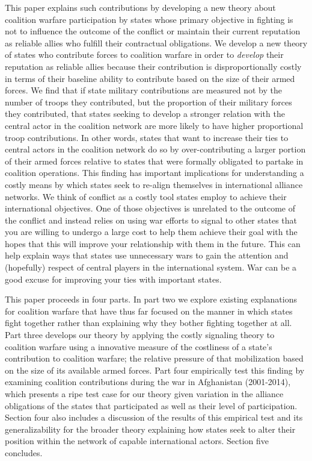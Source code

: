 \documentclass[12pt,letterpaper]{article}
\begin{document}
	This paper explains such contributions by developing a new theory about coalition warfare participation by states whose primary objective in fighting is not to influence the outcome of the conflict or maintain their current reputation as reliable allies who fulfill their contractual obligations. We develop a new theory of states who contribute forces to coalition warfare in order to \textit{develop} their reputation as reliable allies because their contribution is disproportionally costly in terms of their baseline ability to contribute based on the size of their armed forces. We find that if state military contributions are measured not by the number of troops they contributed, but the proportion of their military forces they contributed, that states seeking to develop a stronger relation with the central actor in the coalition network are more likely to have higher proportional troop contributions. In other words, states that want to increase their ties to central actors in the coalition network do so by over-contributing a larger portion of their armed forces relative to states that were formally obligated to partake in coalition operations. This finding has important implications for understanding a costly means by which states seek to re-align themselves in international alliance networks. We think of conflict as a costly tool states employ to achieve their international objectives. One of those objectives is unrelated to the outcome of the conflict and instead relies on using war efforts to signal to other states that you are willing to undergo a large cost to help them achieve their goal with the hopes that this will improve your relationship with them in the future. This can help explain ways that states use unnecessary wars to gain the attention and (hopefully) respect of central players in the international system. War can be a good excuse for improving your ties with important states.

	This paper proceeds in four parts. In part two we explore existing explanations for coalition warfare that have thus far focused on the manner in which states fight together rather than explaining why they bother fighting together at all. Part three develops our theory by applying the costly signaling theory to coalition warfare using a innovative measure of the costliness of a state's contribution to coalition warfare; the relative pressure of that mobilization based on the size of its available armed forces. Part four empirically test this finding by examining coalition contributions during the war in Afghanistan (2001-2014), which presents a ripe test case for our theory given variation in the alliance obligations of the states that participated as well as their level of participation. Section four also includes a discussion of the results of this empirical test and its generalizability for the broader theory explaining how states seek to alter their position within the network of capable international actors. Section five concludes.
\end{document}
